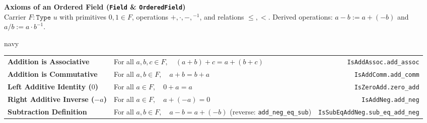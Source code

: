 \documentclass[10pt]{article}
\newcommand{\lean}[1]{\texttt{\scriptsize\color{navy}#1}}
\begin{document}
\begin{center}
  {\Large\sffamily\bfseries\color{navy} Axioms of an Ordered Field (\texttt{Field} \& \texttt{OrderedField})}\\[1pt]
  {\footnotesize\sffamily\color{muted} Carrier $F : \texttt{Type } u$ with primitives $0, 1 \in F$, operations $+, \cdot, -, {}^{-1}$, and relations $\le, <$. Derived operations: $a - b := a + (-b)$ and $a / b := a \cdot b^{-1}$.}
\end{center}
\vspace{-2pt}

\begin{axbox}[title={I. Addition Axioms (Additive Abelian Group on $F$)}]{navy}
\footnotesize
\begin{tabularx}{\linewidth}{@{}>{\raggedright\arraybackslash}p{4.6cm} >{\raggedright\arraybackslash}X r@{}}
\textbf{Addition is Associative} & For all $a, b, c \in F,\quad (a + b) + c = a + (b + c)$ & \lean{IsAddAssoc.add\_assoc} \\
\textbf{Addition is Commutative} & For all $a, b \in F,\quad a + b = b + a$ & \lean{IsAddComm.add\_comm} \\
\textbf{Left Additive Identity ($0$)} & For all $a \in F,\quad 0 + a = a$ & \lean{IsZeroAdd.zero\_add} \\
\textbf{Right Additive Inverse ($-a$)} & For all $a \in F,\quad a + (-a) = 0$ & \lean{IsAddNeg.add\_neg} \\
\textbf{Subtraction Definition} & For all $a, b \in F,\quad a - b = a + (-b)$ \quad (reverse: \lean{add\_neg\_eq\_sub}) & \lean{IsSubEqAddNeg.sub\_eq\_add\_neg} \\
\end{tabularx}
\end{axbox}
\end{document}
